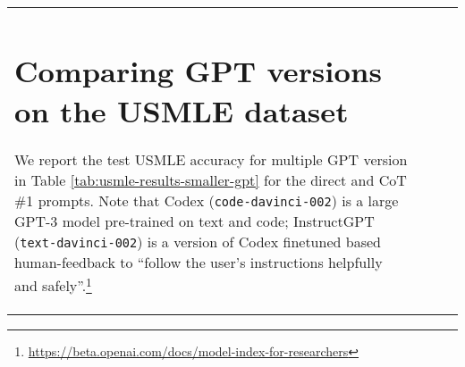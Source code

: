 \documentclass{article} \usepackage{iclr2022_conference,times}
\begin{document}
\begin{table}[h]
\begin{center}
{\begin{tabular}{lccc}
{\begin{multicols}{2}
\end{multicols}

\clearpage
\section{Comparing GPT versions on the USMLE dataset}\label{apdx:gpt-versions-comparison}


We report the test USMLE accuracy for multiple GPT version in Table \ref{tab:usmle-results-smaller-gpt} for the direct and CoT \#1 prompts. Note that Codex (\texttt{code-davinci-002}) is a large GPT-3 model pre-trained on text and code; InstructGPT (\texttt{text-davinci-002}) is a version of Codex finetuned based human-feedback to ``follow the user’s instructions helpfully and safely''.\footnote{\url{https://beta.openai.com/docs/model-index-for-researchers}}

}
\end{tabular}}
\end{center}
\end{table}
\end{document}
